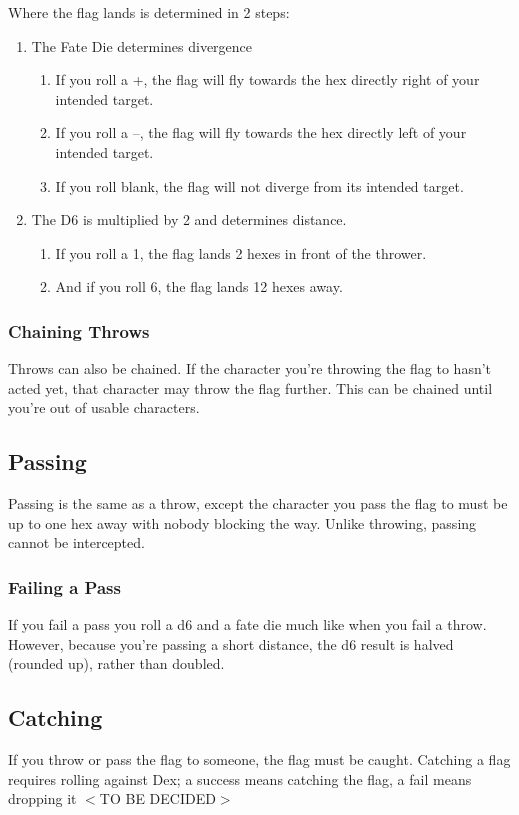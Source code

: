 Where the flag lands is determined in 2 steps:
\begin{enumerate}
    \item The Fate Die determines divergence
    \begin{enumerate}
        \item If you roll a +, the flag will fly towards the hex directly right of your intended target.
        \item If you roll a –, the flag will fly towards the hex directly left of your intended target.
        \item If you roll blank, the flag will not diverge from its intended target.
    \end{enumerate}
    \item The D6 is multiplied by 2 and determines distance.
    \begin{enumerate}
        \item If you roll a 1, the flag lands 2 hexes in front of the thrower.
        \item And if you roll 6, the flag lands 12 hexes away.
    \end{enumerate}
\end{enumerate}

\subsubsection{Chaining Throws}
Throws can also be chained. If the character you're throwing the flag to hasn't acted yet, that character may throw the flag further. This can be chained until you're out of usable characters.
\subsection{Passing}
Passing is the same as a throw, except the character you pass the flag to must be up to one hex away with nobody blocking the way. Unlike throwing, passing cannot be intercepted.
\subsubsection{Failing a Pass}
If you fail a pass you roll a d6 and a fate die much like when you fail a throw.
However, because you’re passing a short distance, the d6 result is halved (rounded up), rather than doubled.
\subsection{Catching}
If you throw or pass the flag to someone, the flag must be caught. Catching a flag requires rolling against Dex; a success means catching the flag, a fail means dropping it $<$TO BE DECIDED$>$

